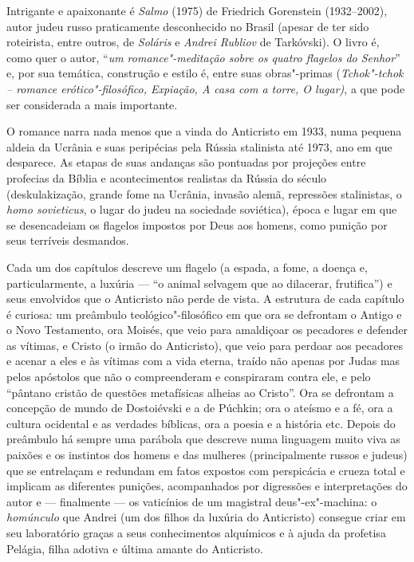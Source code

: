 {Intrigante e apaixonante é \emph{Salmo} (1975) de Friedrich Gorenstein (1932--2002), autor judeu russo praticamente desconhecido no Brasil (apesar de ter sido roteirista, entre outros, de \emph{Soláris}
e \emph{Andrei Rubliov} de Tarkóvski). O livro é, como quer o autor,
``\emph{um romance"-meditação sobre os quatro flagelos do Senhor}'' e,
por sua temática, construção e estilo é, entre suas obras"-primas
(\emph{Tchok"-tchok -- romance erótico"-filosófico, Expiação, A casa com a
torre, O lugar)}, a que pode ser considerada a mais importante.

O romance narra nada menos que a vinda do Anticristo em 1933, numa
pequena aldeia da Ucrânia e suas peripécias pela Rússia stalinista até
1973, ano em que desparece. As etapas de suas andanças são pontuadas por
projeções entre profecias da Bíblia e acontecimentos realistas da Rússia
do século  (deskulakização, grande fome na Ucrânia, invasão alemã,
repressões stalinistas, o \emph{homo sovieticus}, o lugar do judeu na
sociedade soviética), época e lugar em que se desencadeiam os flagelos
impostos por Deus aos homens, como punição por seus terríveis desmandos.

Cada um dos capítulos descreve um flagelo (a espada, a fome, a doença e,
particularmente, a luxúria --- ``o animal selvagem que ao dilacerar,
frutifica'') e seus envolvidos que o Anticristo não perde de vista. A
estrutura de cada capítulo é curiosa: um preâmbulo teológico"-filosófico
em que ora se defrontam o Antigo e o Novo Testamento, ora Moisés, que
veio para amaldiçoar os pecadores e defender as vítimas, e Cristo (o
irmão do Anticristo), que veio para perdoar aos pecadores e acenar a
eles e às vítimas com a vida eterna, traído não apenas por Judas mas
pelos apóstolos que não o compreenderam e conspiraram contra ele, e pelo
``pântano cristão de questões metafísicas alheias ao Cristo''. Ora se
defrontam a concepção de mundo de Dostoiévski e a de Púchkin; ora o ateísmo e a fé,
ora a cultura ocidental e as verdades bíblicas, ora a poesia e a
história etc. Depois do preâmbulo há sempre uma parábola que descreve
numa linguagem muito viva as paixões e os instintos dos homens e das
mulheres (principalmente russos e judeus) que se entrelaçam e redundam
em fatos expostos com perspicácia e crueza total e implicam as
diferentes punições, acompanhados por digressões e interpretações do
autor e --- finalmente --- os vaticínios de um magistral deus"-ex"-machina:
o \emph{homúnculo} que Andrei (um dos filhos da luxúria do Anticristo)
consegue criar em seu laboratório graças a seus conhecimentos alquímicos
e à ajuda da profetisa Pelágia, filha adotiva e última amante do
Anticristo.

}
